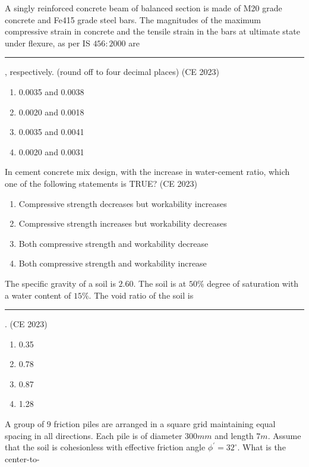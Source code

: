 \iffalse
\title{CE-2023-14-26}
\author{EE24BTECH11041-Mohit}
\section{ce}
\chapter{2023}
\fi

\item A singly reinforced concrete beam of balanced section is made of M20 grade concrete and Fe415 grade steel bars. The magnitudes of the maximum compressive strain in concrete and the tensile strain in the bars at ultimate state under flexure, as per IS $456: 2000$ are \rule{2cm}{0.4pt}, respectively. (round off to four decimal places)
\hfill{(CE 2023)}
\begin{enumerate}
\item 0.0035 and 0.0038
\item 0.0020 and 0.0018
\item 0.0035 and 0.0041
\item 0.0020 and 0.0031
\end{enumerate}
\item In cement concrete mix design, with the increase in water-cement ratio, which one of the following statements is TRUE?
\hfill{(CE 2023)}
\begin{enumerate}
\item Compressive strength decreases but workability increases
\item Compressive strength increases but workability decreases
\item Both compressive strength and workability decrease
\item Both compressive strength and workability increase
\end{enumerate}
\item The specific gravity of a soil is $2.60$. The soil is at $50 \%$ degree of saturation with a
water content of $15 \%$. The void ratio of the soil is \rule{2cm}{0.4pt}.
\hfill{(CE 2023)}
\begin{enumerate}
\item 0.35
\item 0.78
\item 0.87
\item 1.28
\end{enumerate}
\item A group of $9$ friction piles are arranged in a square grid maintaining equal spacing in all directions. Each pile is of diameter $300 mm$ and length $7 m$. Assume that the soil is cohesionless with effective friction angle $\phi^{'} = 32^{\circ}$. What is the center-to-
